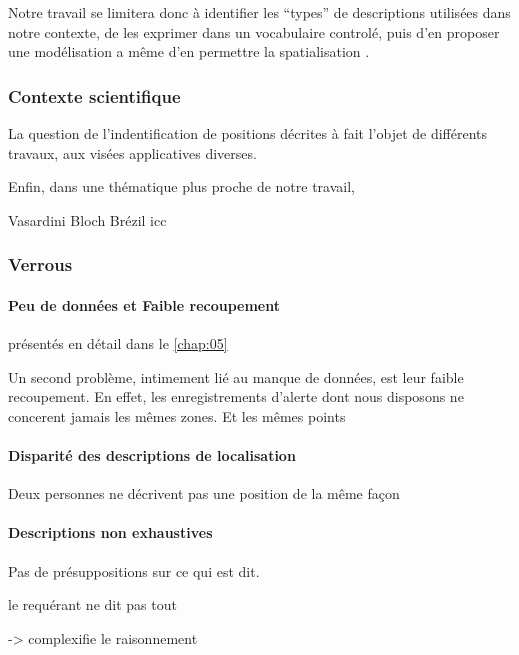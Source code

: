 Notre travail se limitera donc à identifier les \enquote{types} de
descriptions utilisées dans notre contexte, de les exprimer dans un
vocabulaire controlé, puis d'en proposer une modélisation a même d'en
permettre la spatialisation .

\subsubsection{Contexte scientifique}

La question de l'indentification de positions décrites à fait l'objet
de différents travaux, aux visées applicatives diverses.



Enfin, dans une thématique plus proche de notre travail,  

Vasardini
Bloch
Brézil icc

\subsubsection{Verrous}

\paragraph{Peu de données et Faible recoupement}

présentés en détail dans le \autoref{chap:05}

Un second problème, intimement lié au manque de données, est leur
faible recoupement. En effet, les enregistrements d'alerte dont nous
disposons ne concerent jamais les mêmes zones. Et les mêmes points


\paragraph{Disparité des descriptions de localisation}

Deux personnes ne décrivent pas une position de la même façon

\paragraph{Descriptions non exhaustives}

Pas de présuppositions sur ce qui est dit.

le requérant ne dit pas tout

-> complexifie le raisonnement

